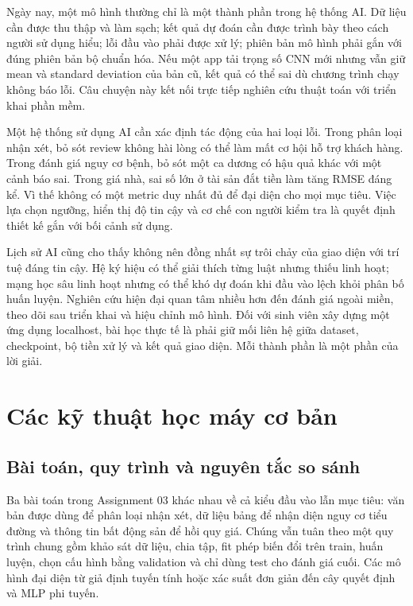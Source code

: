 \documentclass[12pt,a4paper]{report}
\begin{document}
Ngày nay, một mô hình thường chỉ là một thành phần trong hệ thống AI. Dữ liệu cần được thu thập và làm sạch; kết quả dự đoán cần được trình bày theo cách người sử dụng hiểu; lỗi đầu vào phải được xử lý; phiên bản mô hình phải gắn với đúng phiên bản bộ chuẩn hóa. Nếu một app tải trọng số CNN mới nhưng vẫn giữ mean và standard deviation của bản cũ, kết quả có thể sai dù chương trình chạy không báo lỗi. Câu chuyện này kết nối trực tiếp nghiên cứu thuật toán với triển khai phần mềm.

Một hệ thống sử dụng AI cần xác định tác động của hai loại lỗi. Trong phân loại nhận xét, bỏ sót review không hài lòng có thể làm mất cơ hội hỗ trợ khách hàng. Trong đánh giá nguy cơ bệnh, bỏ sót một ca dương có hậu quả khác với một cảnh báo sai. Trong giá nhà, sai số lớn ở tài sản đắt tiền làm tăng RMSE đáng kể. Vì thế không có một metric duy nhất đủ để đại diện cho mọi mục tiêu. Việc lựa chọn ngưỡng, hiển thị độ tin cậy và cơ chế con người kiểm tra là quyết định thiết kế gắn với bối cảnh sử dụng.

Lịch sử AI cũng cho thấy không nên đồng nhất sự trôi chảy của giao diện với trí tuệ đáng tin cậy. Hệ ký hiệu có thể giải thích từng luật nhưng thiếu linh hoạt; mạng học sâu linh hoạt nhưng có thể khó dự đoán khi đầu vào lệch khỏi phân bố huấn luyện. Nghiên cứu hiện đại quan tâm nhiều hơn đến đánh giá ngoài miền, theo dõi sau triển khai và hiệu chỉnh mô hình. Đối với sinh viên xây dựng một ứng dụng localhost, bài học thực tế là phải giữ mối liên hệ giữa dataset, checkpoint, bộ tiền xử lý và kết quả giao diện. Mỗi thành phần là một phần của lời giải.

\chapter{Các kỹ thuật học máy cơ bản}\label{ch:ml}
\section{Bài toán, quy trình và nguyên tắc so sánh}
Ba bài toán trong Assignment 03 khác nhau về cả kiểu đầu vào lẫn mục tiêu: văn bản được dùng để phân loại nhận xét, dữ liệu bảng để nhận diện nguy cơ tiểu đường và thông tin bất động sản để hồi quy giá. Chúng vẫn tuân theo một quy trình chung gồm khảo sát dữ liệu, chia tập, fit phép biến đổi trên train, huấn luyện, chọn cấu hình bằng validation và chỉ dùng test cho đánh giá cuối. Các mô hình đại diện từ giả định tuyến tính hoặc xác suất đơn giản đến cây quyết định và MLP phi tuyến.
\end{document}
